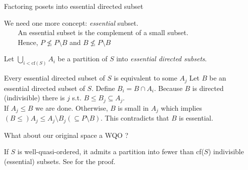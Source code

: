 \documentclass{beamer}
\begin{document}
\begin{frame}{Factoring posets into essential directed subset}

We need one more concept: \emph{essential} subset.\\
\mbox{}~~~~An essential subset is the complement of a small subset.\\
\mbox{}~~~~Hence, $P \not\leq P \setminus B$ and $B \not\leq P \setminus B$

\vspace{10pt}

Let $\bigcup_{i < \text{cf}(S)} A_i$ be a partition of $S$ into \emph{essential directed subsets}.

\vspace{10pt}

\begin{block}{Every essential directed subset of $S$ is equivalent to some $A_j$}
Let $B$ be an essential directed subset of $S$.
Define $B_i = B \cap A_i$.
Because $B$ is directed (indivisible) there is $j$ s.t. $B \leq B_j \subseteq A_j$.\\
If $A_j \leq B$ we are done.
Otherwise, $B$ is small in $A_j$ which implies $(B \leq) A_j \leq A_j \setminus B_j (\subseteq P \setminus B)$.
This contradicts that $B$ is essential.
\end{block}

\end{frame}

\begin{frame}{What about our original space a WQO ?}

\begin{block}{If $S$ is well-quasi-ordered, it admits a partition into fewer than cf($S$) indivisible (essential) subsets.}
See \cite{Diestel01RelatingSubsetsOfAPoset} for the proof.
\end{block}

\end{frame}
\end{document}
